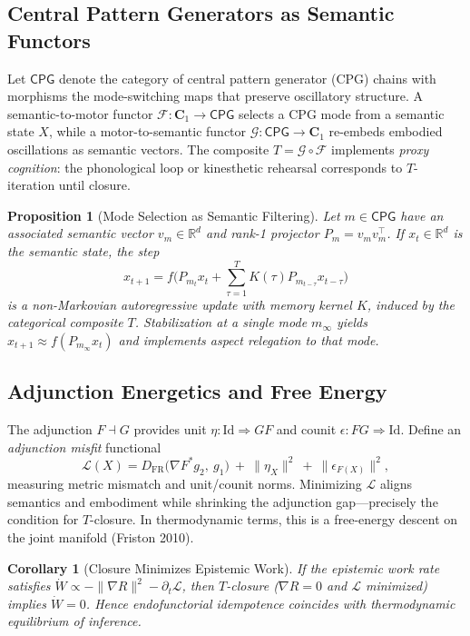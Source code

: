 \documentclass[12pt,a4paper,twoside,openright]{book}
\newtheorem{proposition}[theorem]{Proposition}
\newtheorem{corollary}[theorem]{Corollary}
\begin{document}
\subsection{Central Pattern Generators as Semantic Functors}
Let $\mathsf{CPG}$ denote the category of central pattern generator (CPG) chains with morphisms the mode-switching maps that preserve oscillatory structure. A semantic-to-motor functor $\mathcal{F}:\mathbf{C}_1\to \mathsf{CPG}$ selects a CPG mode from a semantic state $X$, while a motor-to-semantic functor $\mathcal{G}:\mathsf{CPG}\to\mathbf{C}_1$ re-embeds embodied oscillations as semantic vectors. The composite $T=\mathcal{G}\circ\mathcal{F}$ implements \emph{proxy cognition}: the phonological loop or kinesthetic rehearsal corresponds to $T$-iteration until closure.

\begin{proposition}[Mode Selection as Semantic Filtering]
Let $m\in\mathsf{CPG}$ have an associated semantic vector $v_m\in\mathbb{R}^d$ and rank-1 projector $P_m=v_m v_m^\top$. If $x_t\in\mathbb{R}^d$ is the semantic state, the step
\[
x_{t+1}=f\big(P_{m_t}x_t+\sum_{\tau=1}^T K(\tau)P_{m_{t-\tau}}x_{t-\tau}\big)
\]
is a non-Markovian autoregressive update with memory kernel $K$, induced by the categorical composite $T$. Stabilization at a single mode $m_\infty$ yields $x_{t+1}\approx f(P_{m_\infty}x_t)$ and implements aspect relegation to that mode.
\end{proposition}

\subsection{Adjunction Energetics and Free Energy}
The adjunction $F\dashv G$ provides unit $\eta:\mathrm{Id}\Rightarrow GF$ and counit $\epsilon:FG\Rightarrow\mathrm{Id}$. Define an \emph{adjunction misfit} functional
\[
\mathcal{L}(X)=D_{\mathrm{FR}}\big(\nabla F^\ast g_2,\ g_1\big)\ +\ \|\eta_X\|^2\ +\ \|\epsilon_{F(X)}\|^2,
\]
measuring metric mismatch and unit/counit norms. Minimizing $\mathcal{L}$ aligns semantics and embodiment while shrinking the adjunction gap—precisely the condition for $T$-closure. In thermodynamic terms, this is a free-energy descent on the joint manifold (Friston 2010).

\begin{corollary}[Closure Minimizes Epistemic Work]
If the epistemic work rate satisfies $\dot{W}\propto -\|\nabla R\|^2 - \partial_t \mathcal{L}$, then $T$-closure ($\nabla R=0$ and $\mathcal{L}$ minimized) implies $\dot{W}=0$. Hence endofunctorial idempotence coincides with thermodynamic equilibrium of inference.
\end{corollary}
\end{document}
